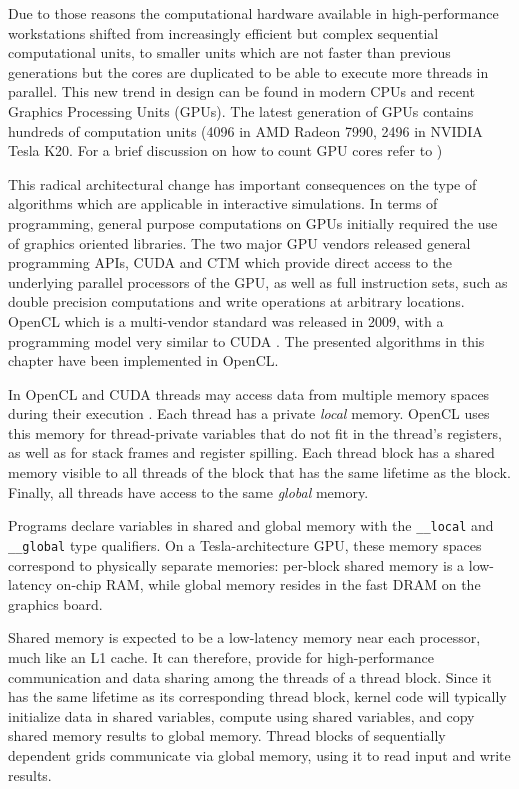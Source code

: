 Due to those reasons the computational hardware available in high-performance workstations shifted from increasingly efficient but complex sequential 
computational units, to smaller units which are not faster than previous generations but the cores are duplicated to be able to execute more threads 
in parallel. This new trend in design can be found in modern CPUs and recent Graphics Processing Units (GPUs). The latest generation of GPUs contains 
hundreds of computation units (4096 in AMD Radeon 7990, 2496 in NVIDIA Tesla K20. For a brief discussion on how to count GPU cores refer to \cite{Fatahalian2008})

This radical architectural change has important consequences on the type of algorithms which are applicable in interactive simulations. In terms of 
programming, general purpose computations on GPUs initially required the use of graphics oriented libraries. The two major GPU vendors released general
programming APIs, CUDA \cite{Nickolls2008} and CTM \cite{peercy2006performance} which provide direct access to the underlying parallel processors of the
GPU, as well as full instruction sets, such as double precision computations and write operations at arbitrary locations. OpenCL which is a multi-vendor
standard was released in 2009, with a programming model very similar to CUDA \cite{gaster2012heterogeneous}. The presented algorithms in this chapter
have been implemented in OpenCL. 

In OpenCL and CUDA threads may access data from multiple memory spaces during their execution \cite{Nickolls2008}. Each thread has a 
private \textit{local} memory. OpenCL uses this memory for thread-private variables that do not fit in the thread's registers, as well 
as for stack frames and register spilling. Each thread block has a shared memory visible to all threads of the block that has the same 
lifetime as the block. Finally, all threads have access to the same \textit{global} memory. 

Programs declare variables in shared and global memory with the \texttt{\_\_local} and \texttt{\_\_global} type qualifiers. On a Tesla-architecture 
GPU, these memory spaces correspond to physically separate memories: per-block shared memory is a low-latency on-chip RAM, while global memory 
resides in the fast DRAM on the graphics board. 

Shared memory is expected to be a low-latency memory near each processor, much like an L1 cache. It can therefore, provide for high-performance 
communication and data sharing among the threads of a thread block. Since it has the same lifetime as its corresponding thread block, kernel 
code will typically initialize data in shared variables, compute using shared variables, and copy shared memory results to global memory. 
Thread blocks of sequentially dependent grids communicate via global memory, using it to read input and write results. 

